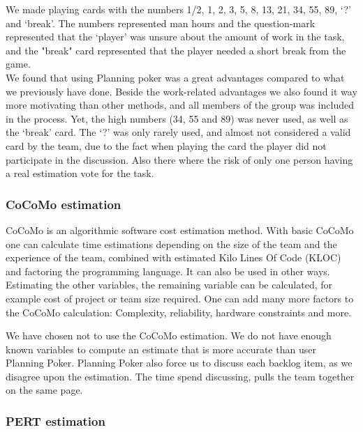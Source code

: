 We made playing cards with the numbers 1/2, 1, 2, 3, 5, 8, 13, 21, 34, 55, 89, `?' and `break'. The numbers represented man hours and the question-mark represented that the `player' was unsure about the amount of work in the task, and the "break" card represented that the player needed a short break from the game.\\
We found that using Planning poker was a great advantages compared to what we previously have done. Beside the work-related advantages we also found it way more motivating than other methods, and all members of the group was included in the process. Yet, the high numbers (34, 55 and 89) was never used, as well as the `break' card. The `?' was only rarely used, and almost not considered a valid card by the team, due to the fact when playing the card the player did not participate in the discussion. Also there where the risk of only one person having a real estimation vote for the task.

\subsubsection{CoCoMo estimation}
CoCoMo is an algorithmic software cost estimation method. With basic CoCoMo one can calculate time estimations depending on the size of the team and the experience of the team, combined with estimated Kilo Lines Of Code (KLOC) and factoring the programming language. It can also be used in other ways. Estimating the other variables, the remaining variable can be calculated, for example cost of project or team size required. One can add many more factors to the CoCoMo calculation: Complexity, reliability, hardware constraints and more.

We have chosen not to use the CoCoMo estimation. We do not have enough known variables to compute an estimate that is more accurate than user Planning Poker. Planning Poker also force us to discuss each backlog item, as we disagree upon the estimation. The time spend discussing, pulls the team together on the same page. 

\subsubsection{PERT estimation}